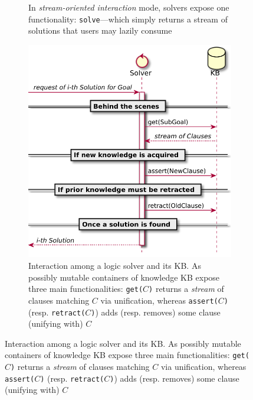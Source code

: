 \documentclass[12pt,a4paper,openright,twoside]{book}
\begin{document}
\begin{figure}
\begin{subfigure}{0.48\linewidth}
        \caption{In \emph{stream-oriented interaction} mode, solvers expose one functionality: \texttt{solve}---which simply returns a stream of solutions that users may lazily consume}
        \label{fig:user-solver-interaction:streams}
    \end{subfigure}

    \begin{subfigure}{0.48\linewidth}\centering
        \includegraphics[width=\linewidth]{figures/streamful-kb.pdf}
        \caption{Interaction among a logic solver and its KB. As possibly mutable containers of knowledge KB expose three main functionalities: \texttt{get($C$)} returns a \emph{stream} of clauses matching $C$ via unification, whereas \texttt{assert($C$)} (resp. \texttt{retract($C$)}) adds (resp. removes) some clause (unifying with) $C$}
        \label{fig:solver-kb-interaction}
    \end{subfigure}
\end{figure}
\end{document}
